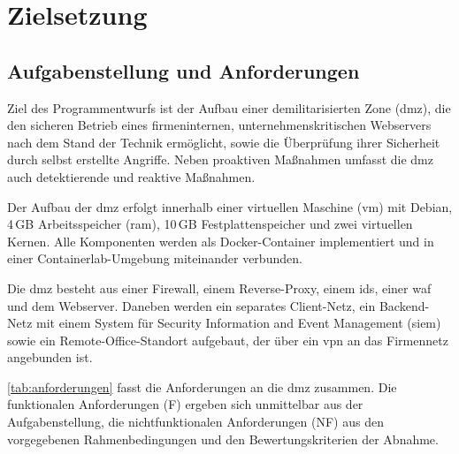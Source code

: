 \chapter{Zielsetzung}\label{chap:zielsetzung}

\section{Aufgabenstellung und Anforderungen}\label{sec:aufgabenstellung-und-anforderungen}

Ziel des Programmentwurfs ist der Aufbau einer demilitarisierten Zone (\acs{dmz}), die den sicheren Betrieb eines firmeninternen, unternehmenskritischen Webservers nach dem Stand der Technik ermöglicht, sowie die Überprüfung ihrer Sicherheit durch selbst erstellte Angriffe. Neben proaktiven Maßnahmen umfasst die \ac{dmz} auch detektierende und reaktive Maßnahmen.

Der Aufbau der \ac{dmz} erfolgt innerhalb einer virtuellen Maschine (\acs{vm}) mit Debian, 4\,GB Arbeitsspeicher (\acs{ram}), 10\,GB Festplattenspeicher und zwei virtuellen Kernen. Alle Komponenten werden als Docker-Container implementiert und in einer Containerlab-Umgebung miteinander verbunden.

Die \ac{dmz} besteht aus einer Firewall, einem Reverse-Proxy, einem \ac{ids}, einer \ac{waf} und dem Webserver. Daneben werden ein separates Client-Netz, ein Backend-Netz mit einem System für Security Information and Event Management (\acs{siem}) sowie ein Remote-Office-Standort aufgebaut, der über ein \ac{vpn} an das Firmennetz angebunden ist.

\autoref{tab:anforderungen} fasst die Anforderungen an die \acs{dmz} zusammen. Die funktionalen Anforderungen (F) ergeben sich unmittelbar aus der Aufgabenstellung, die nichtfunktionalen Anforderungen (NF) aus den vorgegebenen Rahmenbedingungen und den Bewertungskriterien der Abnahme.

